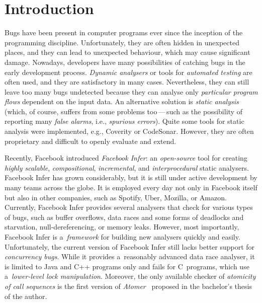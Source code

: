 




\chapter{Introduction}

Bugs have been present in computer programs ever since the inception of the programming discipline. Unfortunately, they are often hidden in unexpected places, and they can lead to unexpected behaviour, which may cause significant damage. Nowadays, developers have many possibilities of catching bugs in the early development process. \emph{Dynamic analysers} or tools for \emph{automated testing} are often used, and they are satisfactory in many cases. Nevertheless, they can still leave too many bugs undetected because they can analyse only \emph{particular program flows} dependent on the input data. An alternative solution is \emph{static analysis} (which, of course, suffers from some problems too\,---\,such as the possibility of reporting many \emph{false alarms}, i.e., \emph{spurious errors}). Quite some tools for static analysis were implemented, e.g., Coverity or CodeSonar. However, they are often proprietary and difficult to openly evaluate and extend.

Recently, Facebook introduced \emph{Facebook Infer}: an \emph{open-source} tool for creating \emph{highly scalable}, \emph{compositional}, \emph{incremental}, and \emph{interprocedural} static analysers. Facebook Infer has grown considerably, but it is still under active development by many teams across the globe. It is employed every day not only in Facebook itself but also in other companies, such as Spotify, Uber, Mozilla, or Amazon. Currently, Facebook Infer provides several analysers that check for various types of bugs, such as buffer overflows, data races and some forms of deadlocks and starvation, null-dereferencing, or memory leaks. However, most importantly, Facebook Infer is a~\emph{framework} for building new analysers quickly and easily. Unfortunately, the current version of Facebook Infer still lacks better support for \emph{concurrency bugs}. While it provides a~reasonably advanced data race analyser, it is limited to Java and C++ programs only and fails for C~programs, which use a~\emph{lower-level lock manipulation}. Moreover, the only available checker of \emph{atomicity of call sequences} is the first version of \emph{Atomer}~\cite{harmimBP} proposed in the bachelor's thesis of the author.


